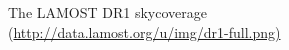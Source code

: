 \documentclass[manuscript]{aastex}
\begin{document}




\clearpage


 \begin{figure}
   \centering
   \caption{The LAMOST DR1 skycoverage (\url{http://data.lamost.org/u/img/dr1-full.png)}
   }
   \label{Fig_all}
   \end{figure}
\end{document}
